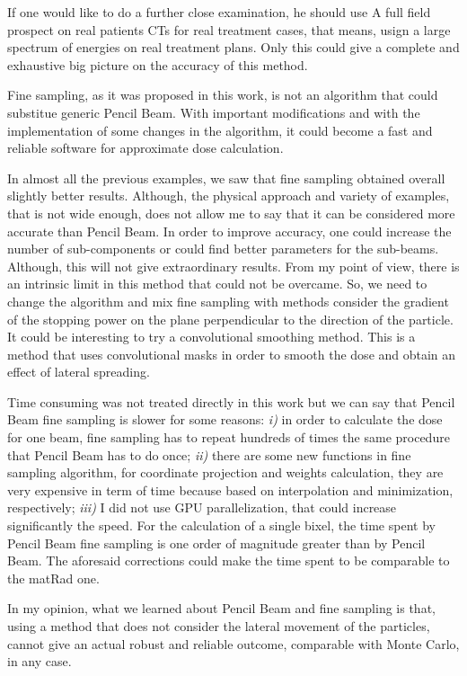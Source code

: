 \documentclass[12pt, a4paper, twoside]{book}
\begin{document}
If one would like to do a further close examination, he should use A full field prospect on real patients CTs for real treatment cases, that means, usign a large spectrum of energies on real treatment plans. Only this could give a complete and exhaustive big picture on the accuracy of this method.

Fine sampling, as it was proposed in this work, is not an algorithm that could substitue generic Pencil Beam. With important modifications and with the implementation of some changes in the algorithm, it could become a fast and reliable software for approximate dose calculation.

In almost all the previous examples, we saw that fine sampling obtained overall slightly better results. Although, the physical approach and variety of examples, that is not wide enough, does not allow me to say that it can be considered more accurate than Pencil Beam. In order to improve accuracy, one could increase the number of sub-components or could find better parameters for the sub-beams. Although, this will not give extraordinary results.
From my point of view, there is an intrinsic limit in this method that could not be overcame. So, we need to change the algorithm and mix fine sampling with methods consider the gradient of the stopping power on the plane perpendicular to the direction of the particle.
It could be interesting to try a convolutional smoothing method. %
This is a method that uses convolutional masks in order to smooth the dose and obtain an effect of lateral spreading.

Time consuming was not treated directly in this work but we can say that Pencil Beam fine sampling is slower for some reasons: \emph{i)} in order to calculate the dose for one beam, fine sampling has to repeat hundreds of times the same procedure that Pencil Beam has to do once; \emph{ii)} there are some new functions in fine sampling algorithm, for coordinate projection and weights calculation, they are very expensive in term of time because based on interpolation and minimization, respectively; \emph{iii)} I did not use GPU parallelization, that could increase significantly the speed.
For the calculation of a single bixel, the time spent by Pencil Beam fine sampling is one order of magnitude greater than by Pencil Beam.
The aforesaid corrections could make the time spent to be comparable to the matRad one.

In my opinion, what we learned about Pencil Beam and fine sampling is that, using a method that does not consider the lateral movement of the particles, cannot give an actual robust and reliable outcome, comparable with Monte Carlo, in any case.
\end{document}
